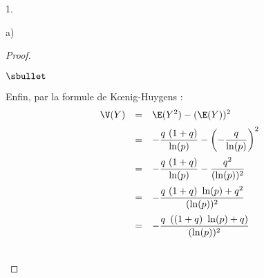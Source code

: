\documentclass[11pt]{article}%
\begin{document}
\begin{noliste}{1.}
\begin{noliste}{a)}
\begin{proof}
\begin{noliste}{$\sbullet$}
      \item Enfin, par la formule de K\oe{}nig-Huygens :
        \[
        \begin{array}{rcl}
          \V(Y) & = & \E(Y^2) - (\E(Y))^2 
          \\[.2cm]
          & = & - \dfrac{q \ (1+q)}{\ln(p)} - \left( -
            \dfrac{q}{\ln(p)} \right)^2
          \\[.4cm]
          & = & - \dfrac{q \ (1+q)}{\ln(p)} - \dfrac{q^2}{(\ln(p))^2}
          \\[.4cm]
          & = & - \dfrac{q \ (1+q) \ \ln(p) + q^2}{(\ln(p))^2}
          \\[.4cm]
          & = & - \dfrac{q \ \left( (1+q) \ \ln(p) + q \right)}{(\ln(p))^2}
        \end{array}
        \]
      \end{noliste}
      ~\\[-1.2cm]
    \end{proof}
  \end{noliste}
\end{noliste}
\end{document}

